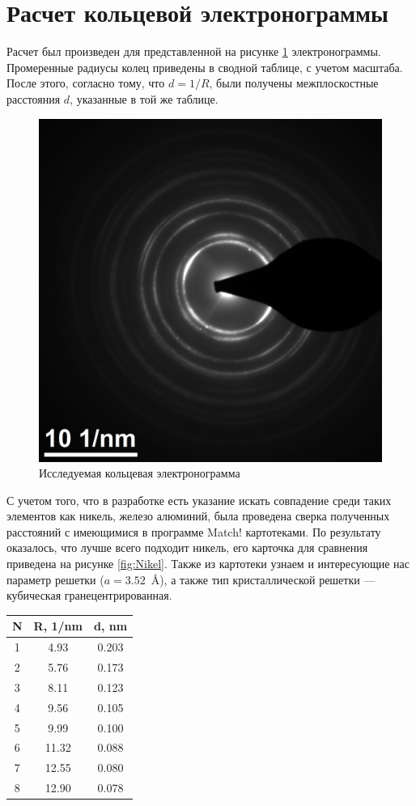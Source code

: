 \documentclass[a4paper, 12pt]{article}
\begin{document}
\section{Расчет кольцевой электронограммы}

Расчет был произведен для представленной на рисунке \ref{fig:circle} электронограммы. Промеренные радиусы колец приведены в сводной таблице, с учетом масштаба. После этого, согласно тому, что $d = 1 / R$, были получены межплоскостные расстояния $d$, указанные в той же таблице.

\begin{figure}[H]
	\centering
	\includegraphics[width=0.7\linewidth]{К3} 
	\caption{Исследуемая кольцевая электронограмма}
	\label{fig:circle}
\end{figure}

С учетом того, что в разработке есть указание искать совпадение среди таких элементов как никель, железо алюминий, была проведена сверка полученных расстояний с имеющимися в программе Match! картотеками. По результату оказалось, что лучше всего подходит никель, его карточка для сравнения приведена на рисунке \ref{fig:Nikel}. Также из картотеки узнаем и интересующие нас параметр решетки ($a = 3.52$~\AA), а также тип кристаллической решетки --- кубическая гранецентрированная.

\begin{table}[H]
	\centering
	\begin{tabular}{|c|c|c|}
		\hline
		N & R, 1/nm & d, nm \\
		\hline
		1 & 4.93 & 0.203  \\
		\hline
		2 & 5.76 & 0.173  \\
		\hline
		3 & 8.11 & 0.123  \\
		\hline
		4 & 9.56 & 0.105  \\
		\hline
		5 & 9.99 & 0.100  \\
		\hline
		6 & 11.32 & 0.088 \\
		\hline
		7 & 12.55 & 0.080  \\
		\hline
		8 & 12.90 & 0.078  \\
		\hline
	\end{tabular}
\end{table}
\end{document}
